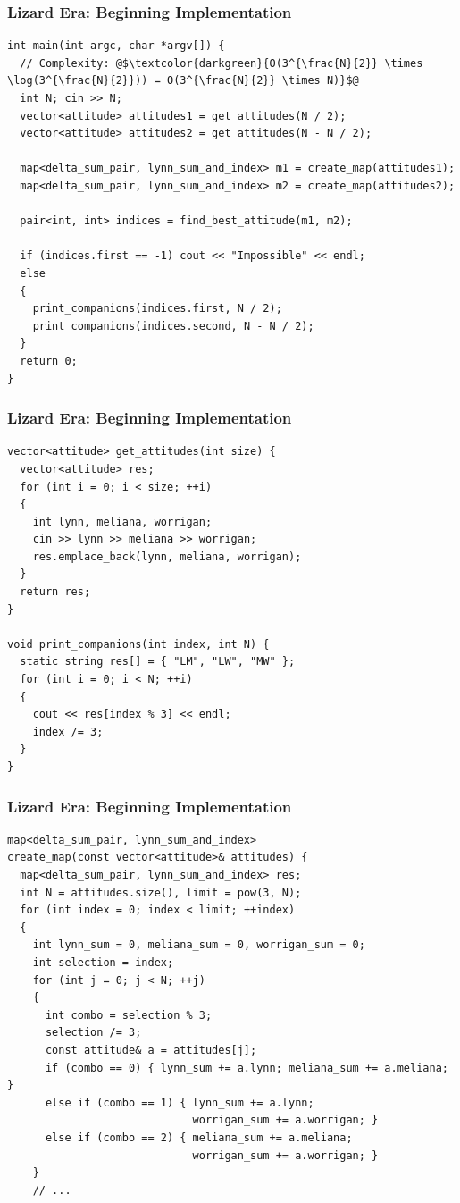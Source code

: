 \documentclass{beamer}
\begin{document}
\begin{frame}[containsverbatim]
\frametitle{Lizard Era: Beginning Implementation}
\scriptsize

\begin{lstlisting}
int main(int argc, char *argv[]) {
  // Complexity: @$\textcolor{darkgreen}{O(3^{\frac{N}{2}} \times \log(3^{\frac{N}{2}})) = O(3^{\frac{N}{2}} \times N)}$@
  int N; cin >> N;
  vector<attitude> attitudes1 = get_attitudes(N / 2);
  vector<attitude> attitudes2 = get_attitudes(N - N / 2);

  map<delta_sum_pair, lynn_sum_and_index> m1 = create_map(attitudes1);
  map<delta_sum_pair, lynn_sum_and_index> m2 = create_map(attitudes2);

  pair<int, int> indices = find_best_attitude(m1, m2);

  if (indices.first == -1) cout << "Impossible" << endl;
  else
  {
    print_companions(indices.first, N / 2);
    print_companions(indices.second, N - N / 2);
  }
  return 0;
}
\end{lstlisting}

\end{frame}

\begin{frame}[containsverbatim]
\frametitle{Lizard Era: Beginning Implementation}
\scriptsize

\begin{lstlisting}
vector<attitude> get_attitudes(int size) {
  vector<attitude> res;
  for (int i = 0; i < size; ++i)
  {
    int lynn, meliana, worrigan;
    cin >> lynn >> meliana >> worrigan;
    res.emplace_back(lynn, meliana, worrigan);
  }
  return res;
}

void print_companions(int index, int N) {
  static string res[] = { "LM", "LW", "MW" };
  for (int i = 0; i < N; ++i)
  {
    cout << res[index % 3] << endl;
    index /= 3;
  }
}
\end{lstlisting}

\end{frame}

\begin{frame}[containsverbatim]
\frametitle{Lizard Era: Beginning Implementation}
\scriptsize

\begin{lstlisting}
map<delta_sum_pair, lynn_sum_and_index>
create_map(const vector<attitude>& attitudes) {
  map<delta_sum_pair, lynn_sum_and_index> res;
  int N = attitudes.size(), limit = pow(3, N);
  for (int index = 0; index < limit; ++index)
  {
    int lynn_sum = 0, meliana_sum = 0, worrigan_sum = 0;
    int selection = index;
    for (int j = 0; j < N; ++j)
    {
      int combo = selection % 3;
      selection /= 3;
      const attitude& a = attitudes[j];
      if (combo == 0) { lynn_sum += a.lynn; meliana_sum += a.meliana; }
      else if (combo == 1) { lynn_sum += a.lynn;
                             worrigan_sum += a.worrigan; }
      else if (combo == 2) { meliana_sum += a.meliana;
                             worrigan_sum += a.worrigan; }
    }
    // ...
\end{lstlisting}

\end{frame}
\end{document}

